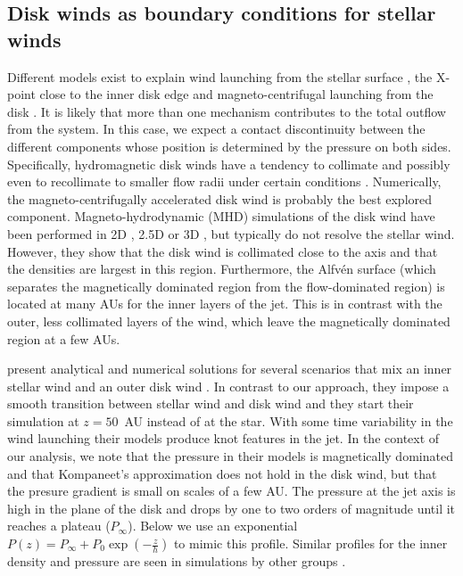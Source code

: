 \documentclass[manuscript]{aastex}
\begin{document}
\subsection{Disk winds as boundary conditions for stellar winds}
\label{sect:boundary}
Different models exist to explain wind launching from the stellar surface \citep{1988ApJ...332L..41K,2005ApJ...632L.135M}, the X-point close to the inner disk edge \citep{1994ApJ...429..781S} and magneto-centrifugal launching from the disk \citep{1982MNRAS.199..883B,2005ApJ...630..945A}. It is likely that more than one mechanism contributes to the total outflow from the system. In this case, we expect a contact discontinuity between the different components whose position is determined by the pressure on both sides. Specifically, hydromagnetic disk winds have a tendency to collimate and possibly even to recollimate to smaller flow radii under certain conditions \citep{1982MNRAS.199..883B,1992ApJ...394..117P}.
Numerically, the magneto-centrifugally accelerated disk wind is probably the best explored component. Magneto-hydrodynamic (MHD) simulations of the disk wind have been performed in 2D \citep[e.g.][]{2005ApJ...630..945A}, 2.5D \citep[e.g.][]{2011ApJ...728L..11R} or 3D \citep[e.g.][]{2006ApJ...653L..33A}, but typically do not resolve the stellar wind. However, they show that the disk wind is collimated close to the axis and that the densities are largest in this region. Furthermore, the Alfv\'en surface (which separates the magnetically dominated region from the flow-dominated region) is located at many AUs for the inner layers of the jet. This is in contrast with the outer, less collimated layers of the wind, which leave the magnetically dominated region at a few AUs.

\citet{2009A&A...502..217M} present analytical and numerical solutions for several scenarios that mix an inner stellar wind and an outer disk wind \citep[this model has been extended in][]{2012A&A...545A..53M,2014A&A...562A.117T}. In contrast to our approach, they impose a smooth transition between stellar wind and disk wind and they start their simulation at $z=50$~AU instead of at the star. With some time variability in the wind launching their models produce knot features in the jet. In the context of our analysis, we note that the pressure in their models is magnetically dominated and that Kompaneet's approximation does not hold in the disk wind, but that the presure gradient is small on scales of a few AU. The pressure at the jet axis is high in the plane of the disk and drops by one to two orders of magnitude until it reaches a plateau ($P_\infty$). Below we use an exponential $P(z)=P_\infty+P_0\exp\left(-\frac{z}{h}\right)$ to mimic this profile.
Similar profiles for the inner density and pressure are seen in simulations by other groups \citep[e.g.\][]{2005ApJ...630..945A,2006ApJ...653L..33A,2008ApJ...678.1109M}.
\end{document}
